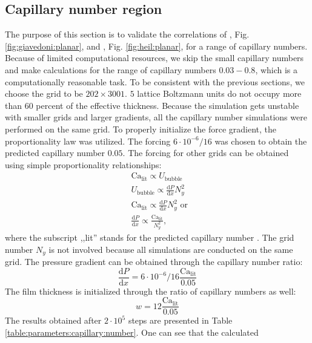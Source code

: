 \documentclass[preprint,12pt]{elsarticle}
\newcommand{\Ca}{\mathrm{Ca}}
\begin{document}
\subsection{Capillary number region}
The purpose of this section is to validate the correlations of
\citet{giavedoni-numerical}, Fig. \ref{fig:giavedoni:planar}, and
\citet{heil-bretherton}, Fig. \ref{fig:heil:planar}, for a range of capillary
numbers. Because of limited computational resources, we skip the
small capillary numbers and make calculations for the range of capillary numbers $0.03-0.8$, which
is a computationally reasonable task.  To be consistent with the previous sections, we choose the grid to be
$202 \times 3001$. $5$ lattice Boltzmann units do not occupy more than $60$
percent of the effective thickness. Because the simulation gets unstable with
smaller grids and larger gradients, all the capillary number simulations were
performed on the same grid. To properly initialize the force gradient, the
proportionality law was utilized. The forcing
$6 \cdot 10^{-6}/16$ was chosen to obtain the predicted capillary
number $0.05$. The forcing for other grids can be obtained using
simple proportionality relationships:
\begin{equation}
\begin{aligned}
&\Ca_{\mathrm{lit}} \propto U_{\mathrm{bubble}}\\
&U_{\mathrm{bubble}} \propto \frac{\mathrm{d}P}{\mathrm{d}x} N_y^2\\
&\Ca_{\mathrm{lit}} \propto \frac{\mathrm{d}P}{\mathrm{d} x} N_y^2 \text{ or }\\
&\frac{\mathrm{d}P}{\mathrm{d} x} \propto \frac{\Ca_{\mathrm{lit}}}{N_y^2},
\end{aligned}
\end{equation}
where the subscript ,,lit'' stands for the predicted capillary number
\cite{giavedoni-numerical,heil-bretherton}. The grid number $N_y$ is not
involved because all simulations are conducted on the same grid.
The pressure gradient can be obtained through the capillary number
ratio:
\begin{equation}
\frac{\mathrm{d}P}{\mathrm{d} x}=6 \cdot 10^{-6}/16 \frac{\Ca_{\mathrm{lit}}}{0.05}
\end{equation}
The film thickness is initialized through the ratio of capillary numbers as well:
\begin{equation*}
w=12 \frac{\Ca_{\mathrm{lit}}}{0.05}
\end{equation*}
The results obtained after $2\cdot10^5$ steps are presented in Table
\ref{table:parameters:capillary:number}. One can see that the calculated
\end{document}
